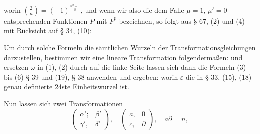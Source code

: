 worin $\left(\frac{2}{n}\right) = (-1)^{\frac{n^2-1}{8}}$, und wenn wir also die dem Falle $\mu = 1$, $\mu' = 0$ entsprechenden Funktionen $P$ mit $P^0$ bezeichnen, so folgt aus § 67, (2) und (4) mit Rücksicht auf § 34, (10):

Um durch solche Formeln die sämtlichen Wurzeln der Transformationsgleichungen darzustellen, bestimmen wir eine lineare Transformation folgendermaßen:
und ersetzen $\omega$ in (1), (2) durch
auf die linke Seite lassen sich dann die Formeln (3) bis (6) § 39 und (19), § 38 anwenden und ergeben:
worin $\varepsilon$ die in § 33, (15), (18) genau definierte 24ste Einheitswurzel ist.

Nun lassen sich zwei Transformationen
\[
\begin{pmatrix}\alpha'; & \beta'\\ \gamma', & \delta'\end{pmatrix}, \quad \begin{pmatrix}a, & 0\\ c, & \partial\end{pmatrix}, \quad a\partial = n,
\]
